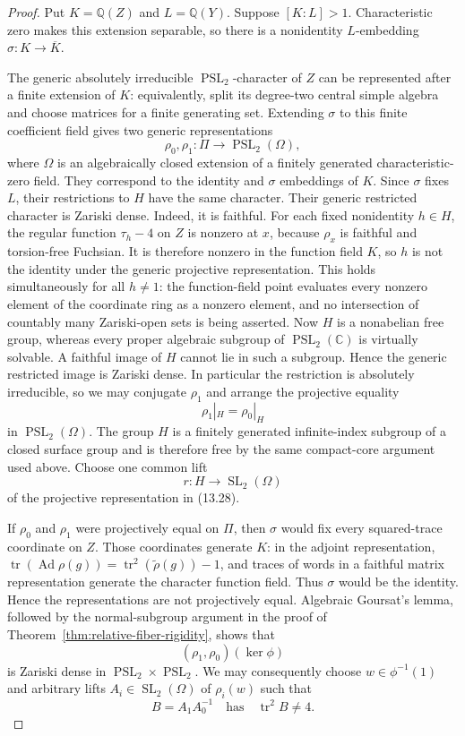 \documentclass[11pt,reqno]{amsart}
\theoremstyle{definition}
\theoremstyle{remark}
\newcommand{\C}{\mathbb C}
\newcommand{\Q}{\mathbb Q}
\newcommand{\Tr}{\operatorname{tr}}
\newcommand{\SL}{\operatorname{SL}}
\newcommand{\PSL}{\operatorname{PSL}}
\newcommand{\Ad}{\operatorname{Ad}}
\begin{document}
\begin{proof}
Put \(K=\Q(Z)\) and \(L=\Q(Y)\).  Suppose \([K:L]>1\).  Characteristic
zero makes this extension separable, so there is a nonidentity
\(L\)-embedding \(\sigma\colon K\to\overline K\).

The generic absolutely irreducible \(\PSL_2\)-character of \(Z\) can be
represented after a finite extension of \(K\): equivalently, split its
degree-two central simple algebra and choose matrices for a finite
generating set.  Extending \(\sigma\) to this finite coefficient field
gives two generic representations
\[
 \rho_0,\rho_1\colon\Pi\longrightarrow\PSL_2(\Omega),
\]
where \(\Omega\) is an algebraically closed extension of a finitely
generated characteristic-zero field.  They correspond to the identity and
\(\sigma\) embeddings of \(K\).  Since \(\sigma\) fixes \(L\), their
restrictions to \(H\) have the same character.  Their generic restricted
character is Zariski dense.  Indeed, it is faithful.  For each fixed
nonidentity \(h\in H\), the regular function \(\tau_h-4\) on \(Z\) is
nonzero at \(x\), because \(\rho_x\) is faithful and torsion-free Fuchsian.
It is therefore nonzero in the function field \(K\), so \(h\) is not the
identity under the generic projective representation.  This holds
simultaneously for all \(h\ne1\): the function-field point evaluates every
nonzero element of the coordinate ring as a nonzero element, and no
intersection of countably many Zariski-open sets is being asserted.  Now
\(H\) is a nonabelian free group, whereas every proper algebraic subgroup
of \(\PSL_2(\C)\) is virtually solvable.  A faithful image of \(H\) cannot
lie in such a subgroup.  Hence the generic restricted image is Zariski
dense.  In particular the restriction is absolutely
irreducible, so we may conjugate \(\rho_1\) and arrange the projective
equality
\[
 \rho_1|_H=\rho_0|_H
\tag{13.28}
\]
in \(\PSL_2(\Omega)\).  The group \(H\) is a finitely generated
infinite-index subgroup of a closed surface group and is therefore free by
the same compact-core argument used above.  Choose one common lift
\[
 r\colon H\longrightarrow\SL_2(\Omega)
\]
of the projective representation in (13.28).

If \(\rho_0\) and \(\rho_1\) were projectively equal on \(\Pi\), then
\(\sigma\) would fix every squared-trace coordinate on \(Z\).  Those
coordinates generate \(K\): in the adjoint representation,
\(\Tr(\Ad \rho(g))=\Tr^2(\widetilde\rho(g))-1\), and traces of words in a
faithful matrix representation generate the character function field.
Thus \(\sigma\) would be the identity.  Hence the representations are not
projectively equal.  Algebraic Goursat's lemma,
followed by the normal-subgroup argument in the proof of
Theorem~\ref{thm:relative-fiber-rigidity}, shows that
\[
 (\rho_1,\rho_0)(\ker\phi)
\]
is Zariski dense in \(\PSL_2\times\PSL_2\).  We may consequently choose
\(w\in\phi^{-1}(1)\) and arbitrary lifts \(A_i\in\SL_2(\Omega)\) of
\(\rho_i(w)\) such that
\[
 B=A_1A_0^{-1}
 \quad\text{has}\quad \Tr^2B\ne4.
\tag{13.29}
\]


\end{proof}
\end{document}
